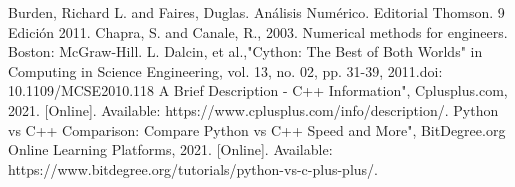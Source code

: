 \documentclass[conference]{IEEEtran}
\begin{document}
\begin{thebibliography}{00}
 Burden, Richard L. and Faires, Duglas. Análisis Numérico. Editorial Thomson. 9 Edición 2011.
 Chapra, S. and Canale, R., 2003. Numerical methods for engineers. Boston: McGraw-Hill.
L. Dalcin, et al.,"Cython: The Best of Both Worlds" in Computing in Science  Engineering, vol. 13, no. 02, pp. 31-39, 2011.doi: 10.1109/MCSE2010.118
 A Brief Description - C++ Information", Cplusplus.com, 2021. [Online]. Available: https://www.cplusplus.com/info/description/.
 Python vs C++ Comparison: Compare Python vs C++ Speed and More", BitDegree.org Online Learning Platforms, 2021. [Online]. Available: https://www.bitdegree.org/tutorials/python-vs-c-plus-plus/.
\end{thebibliography}
\end{document}
